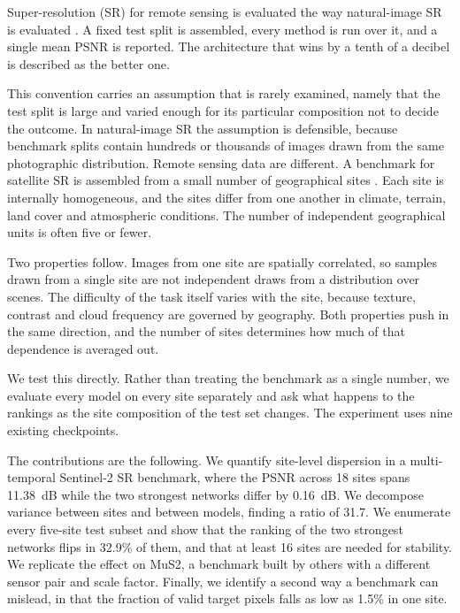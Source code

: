 \documentclass[journal]{IEEEtran}
\begin{document}
Super-resolution (SR) for remote sensing is evaluated the way natural-image SR
is evaluated \cite{deepsum2020,diffusionsat2024}. A fixed test split is assembled,
every method is run over it, and a single mean PSNR is reported. The architecture
that wins by a tenth of a decibel is described as the better one.

This convention carries an assumption that is rarely examined, namely that the
test split is large and varied enough for its particular composition not to decide
the outcome. In natural-image SR the assumption is defensible, because benchmark
splits contain hundreds or thousands of images drawn from the same photographic
distribution. Remote sensing data are different. A benchmark for satellite SR is
assembled from a small number of geographical sites \cite{mus2}. Each site is
internally homogeneous, and the sites differ from one another in climate, terrain,
land cover and atmospheric conditions. The number of independent geographical
units is often five or fewer.

Two properties follow. Images from one site are spatially correlated, so samples
drawn from a single site are not independent draws from a distribution over
scenes. The difficulty of the task itself varies with the site, because texture,
contrast and cloud frequency are governed by geography. Both properties push in
the same direction, and the number of sites determines how much of that dependence
is averaged out.

We test this directly. Rather than treating the benchmark as a single number, we
evaluate every model on every site separately and ask what happens to the rankings
as the site composition of the test set changes. The experiment uses nine existing
checkpoints.

The contributions are the following. We quantify site-level dispersion in a
multi-temporal Sentinel-2 SR benchmark, where the PSNR across 18 sites spans
11.38~dB while the two strongest networks differ by 0.16~dB. We decompose variance
between sites and between models, finding a ratio of 31.7. We enumerate every
five-site test subset and show that the ranking of the two strongest networks
flips in 32.9\% of them, and that at least 16 sites are needed for stability. We
replicate the effect on MuS2, a benchmark built by others with a different sensor
pair and scale factor. Finally, we identify a second way a benchmark can mislead,
in that the fraction of valid target pixels falls as low as 1.5\% in one site.

\end{document}
